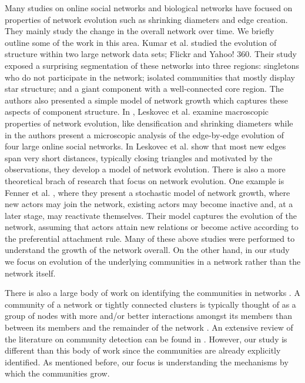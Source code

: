 Many studies on online social networks and biological
networks have focused on properties of network evolution such as shrinking 
diameters and edge creation. They mainly study the change in the overall
network over time. We briefly outline some of the work in this area.
Kumar et al.  \cite{kumar_tomkins} studied the evolution of structure within two large network data sets; Flickr and Yahoo! 360. Their study exposed a surprising segmentation of these networks into three regions: singletons who do not participate in the network; isolated communities that mostly display star structure; and a giant component with a well-connected core region. The authors also presented a simple model of network growth which captures these aspects of component structure. 
In \cite{LKF}, Leskovec et al. examine macroscopic properties of network evolution, like densification and shrinking diameters while in \cite{micro_evol} the authors present a microscopic analysis of the edge-by-edge evolution of four large online social networks. In \cite{micro_evol} Leskovec et al. show that most new edges span very short distances, typically closing triangles and motivated by the observations, they develop a model of network evolution.
There is also a more theoretical brach of research that focus on network evolution. One example is Fenner et al. \cite{stoch_evol}, where they present a stochastic model of network growth, where new actors may join the network, existing actors may become inactive and, at a later stage, may reactivate themselves. Their model captures the evolution of the network, assuming that actors attain new relations or become active according to the preferential attachment rule.
Many of these above studies were performed to understand the growth of the network overall.
On the other hand, in our study we focus on evolution of the 
underlying communities in a network rather than the network itself. 

There is also a large body of work on identifying the communities in 
networks \cite{newman, danon, www10, comm_lin}.
A community of a network or tightly connected clusters is typically thought of
as a group of nodes with more and/or better interactions amongst
its members than between its members and the remainder of the
network \cite{define_comm}. An extensive review of the literature on
community detection can be found in \cite{com_detect}. 
However, our study is different than this body of work since the communities are 
already explicitly identified. As mentioned before, our focus is understanding 
the mechanisms by which the communities grow.

